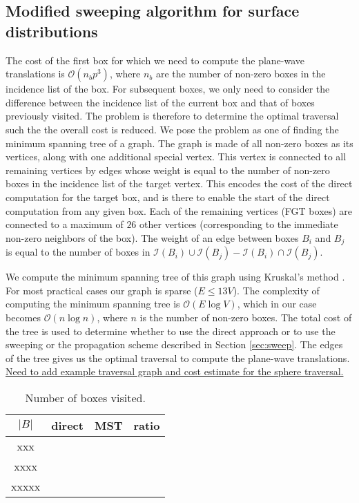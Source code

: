 \subsection{Modified sweeping algorithm for surface distributions} 
\label{sec:mst}
The cost of the first box for which we need to compute the plane-wave translations is $\mathcal{O}(n_bp^3)$, where $n_b$ are the number of non-zero boxes in the incidence list of the box. For subsequent boxes, we only need to consider the difference between the incidence list of the current box and that of boxes previously visited. The problem is therefore to determine the optimal traversal such the the overall cost is reduced. We pose the problem as one of finding the minimum spanning tree of a graph. The graph is made of all non-zero boxes as its vertices, along with one additional special vertex. This vertex is connected to all remaining vertices by edges whose weight is equal to the number of non-zero boxes in the incidence list of the target vertex. This encodes the cost of the direct computation for the target box, and is there to enable the start of the direct computation from any given box. Each of the remaining vertices (FGT boxes) are connected to a maximum of $26$ other vertices (corresponding to the immediate non-zero neighbors of the box). The weight of an edge between boxes $B_i$ and $B_j$ is equal to the number of boxes in $\mathcal{I}(B_i)\cup\mathcal{I}(B_j) - \mathcal{I}(B_i)\cap\mathcal{I}(B_j)$.    

We compute the minimum spanning tree of this graph using Kruskal's method \cite{kruskal56}. For most practical cases our graph is sparse ($E\le13V$). The complexity of computing the minimum spanning tree is $\mathcal{O}(E\log V)$, which in our case becomes $\mathcal{O}(n\log n)$, where $n$ is the number of non-zero boxes. The total cost of the tree is used to determine whether to use the direct approach or to use the sweeping or the propagation scheme described in Section \ref{sec:sweep}. The edges of the tree gives us the optimal traversal to compute the plane-wave translations. \ul{Need to add example traversal graph and cost estimate for the sphere traversal.}

\begin{table*}[bht]
\centering
\begin{tabular}{cccc}\hline
         $|B|$  &  direct & MST & ratio \\ \hline
         xxx & & &  \\  
        xxxx & & &  \\  
       xxxxx & & &  \\  
\hline
\end{tabular}
\caption{Number of boxes visited.\label{count}}
\end{table*}